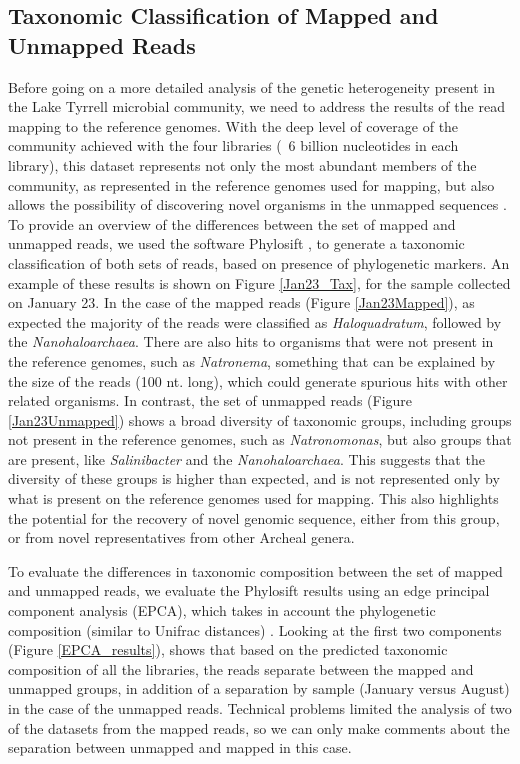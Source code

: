 \clearpage
\subsection{Taxonomic Classification of Mapped and Unmapped Reads}

Before going on a more detailed analysis of the genetic heterogeneity present in the Lake Tyrrell microbial community, we need to address the results of the read mapping to the reference genomes. With the deep level of coverage of the community achieved with the four libraries (~6 billion nucleotides in each library), this dataset represents not only the most abundant members of the community, as represented in the reference genomes used for mapping, but also allows the possibility of discovering novel organisms in the unmapped sequences \cite{Narasingarao:2012kp,Albertsen:2013gpa}. To provide an overview of the differences between the set of mapped and unmapped reads, we used the software Phylosift \cite{Darling:2014ej}, to generate a taxonomic classification of both sets of reads, based on presence of phylogenetic markers. An example of these results is shown on Figure \ref{Jan23_Tax}, for the sample collected on January 23. In the case of the mapped reads (Figure \ref{Jan23Mapped}), as expected the majority of the reads were classified as \textit{Haloquadratum}, followed by the \textit{Nanohaloarchaea}. There are also hits to organisms that were not present in the reference genomes, such as \textit{Natronema}, something that can be explained by the size of the reads (100 nt. long), which could generate spurious hits with other related organisms. In contrast, the set of unmapped reads (Figure \ref{Jan23Unmapped}) shows a broad diversity of taxonomic groups, including groups not present in the reference genomes, such as \textit{Natronomonas}, but also groups that are present, like \textit{Salinibacter} and the \textit{Nanohaloarchaea}. This suggests that the diversity of these groups is higher than expected, and is not represented only by what is present on the reference genomes used for mapping. This also highlights the potential for the recovery of novel genomic sequence, either from this group, or from novel representatives from other Archeal genera.

To evaluate the differences in taxonomic composition between the set of mapped and unmapped reads, we evaluate the Phylosift results using an edge principal component analysis (EPCA), which takes in account the phylogenetic composition (similar to Unifrac distances) \cite{Matsen:2011wn}. Looking at the first two components (Figure \ref{EPCA_results}), shows that based on the predicted taxonomic composition of all the libraries, the reads separate between the mapped and unmapped groups, in addition of a separation by sample (January versus August) in the case of the unmapped reads. Technical problems limited the analysis of two of the datasets from the mapped reads, so we can only make comments about the separation between unmapped and mapped in this case.

